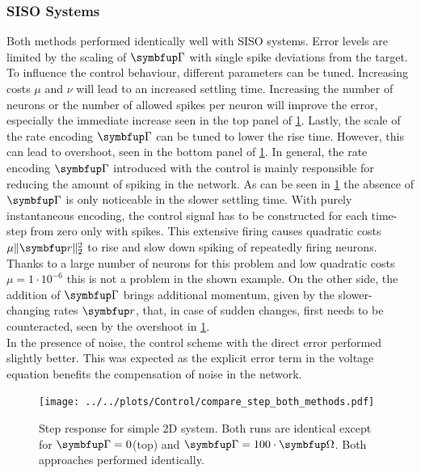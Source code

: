 \subsubsection{\ac{SISO} Systems}
Both methods performed identically well with \ac{SISO} systems. Error levels are limited by the scaling of $\bmu{\Gamma}$ with single spike deviations from the target.\\
To influence the control behaviour, different parameters can be tuned. Increasing costs $\mu$ and $\nu$ will lead to an increased settling time. Increasing the number of neurons or the number of allowed spikes per neuron will improve the error, especially the immediate increase seen in the top panel of \cref{fig:step_compare}. Lastly, the scale of the rate encoding $\bmu{\Gamma}$ can be tuned to lower the rise time. However, this can lead to overshoot, seen in the bottom panel of \cref{fig:step_compare}. In general, the rate encoding $\bmu{\Gamma}$ introduced with the control is mainly responsible for reducing the amount of spiking in the network. As can be seen in \cref{fig:step_compare} the absence of $\bmu{\Gamma}$ is only noticeable in the slower settling time. With purely instantaneous encoding, the control signal has to be constructed for each time-step from zero only with spikes. This extensive firing causes quadratic costs $\mu\|\bmu{r}\|^2_2$ to rise and slow down spiking of repeatedly firing neurons. Thanks to a large number of neurons for this problem and low quadratic costs $\mu = 1\cdot10^{-6}$ this is not a problem in the shown example. On the other side, the addition of $\bmu{\Gamma}$ brings additional momentum, given by the slower-changing rates $\bmu{r}$, that, in case of sudden changes, first needs to be counteracted, seen by the overshoot in \cref{fig:step_compare}.\\
In the presence of noise, the control scheme with the direct error performed slightly better. This was expected as the explicit error term in the voltage equation benefits the compensation of noise in the network.
\begin{figure}
	\centering
	\texttt{[image: ../../plots/Control/compare\_step\_both\_methods.pdf]}
	\caption{Step response for simple 2D system. Both runs are identical except for $\bmu{\Gamma} = 0$(top) and $\bmu{\Gamma} = 100\cdot\bmu{\Omega}$. Both approaches performed identically.}
	\label{fig:step_compare}
\end{figure}



